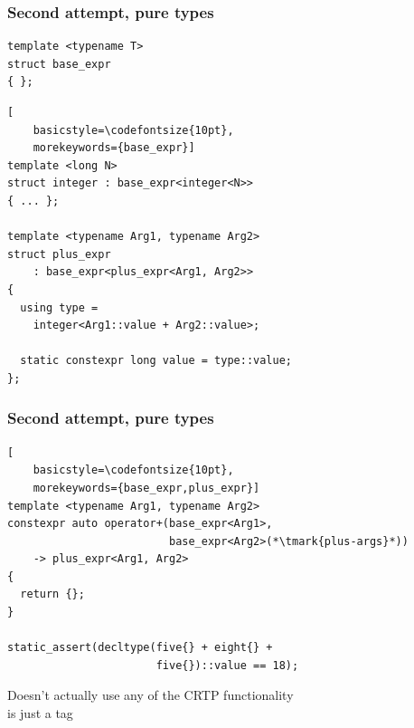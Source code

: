 \documentclass[14pt]{beamer}
\begin{document}
\begin{frame}[fragile]
  \frametitle{Second attempt, pure types}

  \begin{lstlisting}[basicstyle=\codefontsize{10pt}]
template <typename T>
struct base_expr
{ };
  \end{lstlisting}

  \begin{lstlisting}[
    basicstyle=\codefontsize{10pt},
    morekeywords={base_expr}]
template <long N>
struct integer : base_expr<integer<N>>
{ ... };

template <typename Arg1, typename Arg2>
struct plus_expr
    : base_expr<plus_expr<Arg1, Arg2>>
{
  using type = 
    integer<Arg1::value + Arg2::value>;

  static constexpr long value = type::value;
};
  \end{lstlisting}

\end{frame}

\begin{frame}[fragile]
  \frametitle{Second attempt, pure types}

  \begin{lstlisting}[
    basicstyle=\codefontsize{10pt},
    morekeywords={base_expr,plus_expr}]
template <typename Arg1, typename Arg2>
constexpr auto operator+(base_expr<Arg1>,
                         base_expr<Arg2>(*\tmark{plus-args}*))
    -> plus_expr<Arg1, Arg2>
{
  return {};
}

static_assert(decltype(five{} + eight{} +
                       five{})::value == 18);
  \end{lstlisting}

   {
    \vspace{.3cm}
    Doesn't actually use any of the CRTP functionality\\
     is just a tag
  }

  \nointerlineskip

\end{frame}
\end{document}
